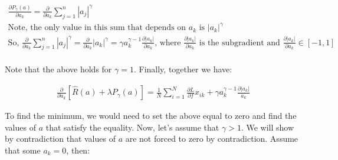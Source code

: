 \documentclass[11pt]{article}
\begin{document}
\begin{gather*}
\frac{\partial P_{\gamma} (a)}{\partial a_{k}} = 
\frac{\partial}{\partial a_{k}} \sum_{j = 1}^{n} |a_{j}|^{\gamma}\\
\text{Note, the only value in this sum that depends on } a_{k} 
\text{ is } |a_{k}|^{\gamma}\\
\text{So, } \frac{\partial}{\partial a_{k}} \sum_{j = 1}^{n} |a_{j}|^{\gamma} = 
\frac{\partial}{\partial a_{k}} |a_{k}|^{\gamma} = 
\gamma a_{k}^{\gamma - 1} \frac{\partial |a_{k}|}{\partial a_{k}} 
\text{, where } \frac{\partial |a_{k}|}{\partial a_{k}} 
\text{ is the subgradient and } 
\frac{\partial |a_{k}|}{\partial a_{k}} \in [-1, 1]\\
\end{gather*}

\vspace{5mm}
\noindent
Note that the above holds for $\gamma = 1$. Finally, together we have:

\begin{gather*}
\frac{\partial}{\partial a_{k}} [\hat{R}(a) + \lambda P_{\gamma}(a)] = 
\frac{1}{N} \sum_{i = 1}^{N} \frac{\partial L}{\partial f} x_{ik} + 
\gamma a_{k}^{\gamma - 1} \frac{\partial |a_{k}|}{a_{k}}
\end{gather*}

\vspace{5mm}
\noindent
To find the minimum, we would need to set the above equal to zero and find the 
values of $a$ that satisfy the equality. Now, let's assume that $\gamma > 1$. 
We will show by contradiction that values of $a$ are not forced to zero by 
contradiction. Assume that some $a_{k} = 0$, then:
\end{document}
